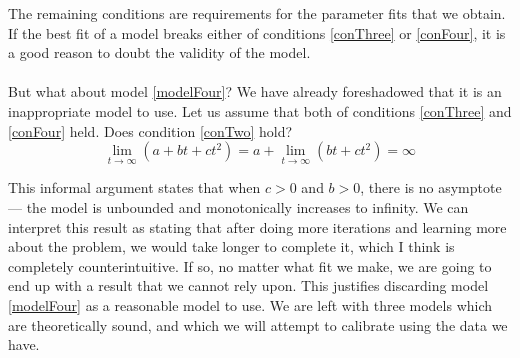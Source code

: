 The remaining conditions are requirements for the parameter fits that we obtain.
If the best fit of a model breaks either of conditions \ref{conThree} or
\ref{conFour}, it is a good reason to doubt the validity of the model.\\
\\
But what about model \ref{modelFour}?
We have already foreshadowed that it is an inappropriate model to use.
Let us assume that both of conditions \ref{conThree} and \ref{conFour} held.
Does condition \ref{conTwo} hold?
\begin{equation}
  \lim_{t \to \infty} (a + bt + ct^2) = a + \lim_{t \to \infty} (bt+ct^2) =
  \infty
\end{equation}

This informal argument states that when $c > 0$ and $b > 0$, there is no
asymptote --- the model is unbounded and monotonically increases to infinity.
We can interpret this result as stating that after doing more iterations and
learning more about the problem, we would take longer to complete it, which I
think is completely counterintuitive.
If so, no matter what fit we make, we are going to end up with a result that we
cannot rely upon.
This justifies discarding model \ref{modelFour} as a reasonable model to use.
We are left with three models which are theoretically sound, and which we will
attempt to calibrate using the data we have.

